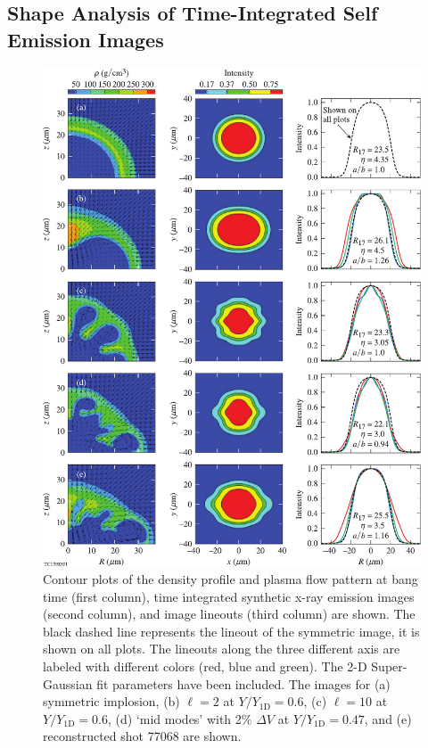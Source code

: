 \documentclass[aip,reprint]{revtex4-1}
\begin{document}
%
%
%
%
\subsection{Shape Analysis of Time-Integrated Self Emission Images}
\label{sec:Exp_intimage}
%
%
%
\begin{figure}
\includegraphics{Fig10_Bose}
\caption{\label{fig:Exp_shape1} \footnotesize{Contour plots of the density profile and plasma flow pattern at bang time (first column), time integrated synthetic x-ray emission images (second column), and image lineouts (third column) are shown. The black dashed line represents the lineout of the symmetric image, it is shown on all plots. The lineouts along the three different axis are labeled with different colors (red, blue and green). The 2-D Super-Gaussian fit parameters have been included. The images for (a) symmetric implosion, (b) $\ell=2$ at $Y/Y_\text{1D}=0.6$, (c) $\ell=10$ at $Y/Y_\text{1D}=0.6$, (d) `mid modes' with 2$\%$ $\Delta V$ at $Y/Y_\text{1D}=0.47$, and (e) reconstructed shot 77068 are shown.}}
\end{figure}
\end{document}
